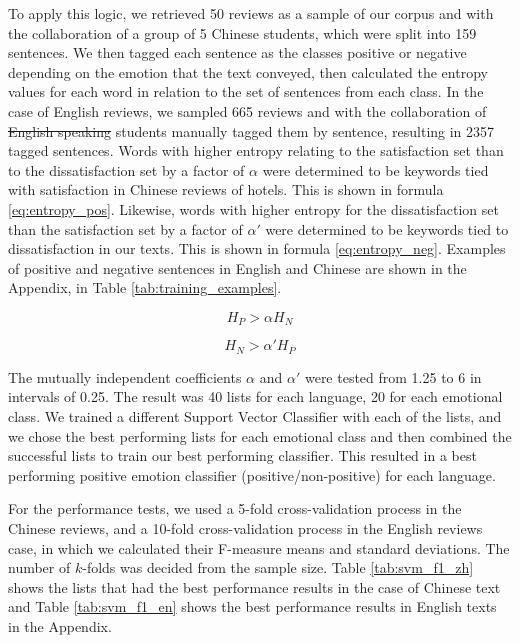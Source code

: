 \documentclass[review]{elsarticle}
\providecommand{\DIFadd}[1]{{\protect\color{blue}\uwave{#1}}} %
\providecommand{\DIFdel}[1]{{\protect\color{red}\sout{#1}}}                      %
\providecommand{\DIFaddbegin}{} %
\providecommand{\DIFaddend}{} %
\providecommand{\DIFdelbegin}{} %
\providecommand{\DIFdelend}{} %
\newcommand{\DIFscaledelfig}{0.5}
\newlength{\DIFdelgraphicswidth} %
\newlength{\DIFdelgraphicsheight} %
\newcommand{\DIFaddincludegraphics}[2][]{{\color{blue}\fbox{\DIFOincludegraphics[#1]{#2}}}} %
\newcommand{\DIFdelincludegraphics}[2][]{%
\sbox{\DIFdelgraphicsbox}{\DIFOincludegraphics[#1]{#2}}%
\settoboxwidth{\DIFdelgraphicswidth}{\DIFdelgraphicsbox} %
\settoboxtotalheight{\DIFdelgraphicsheight}{\DIFdelgraphicsbox} %
\scalebox{\DIFscaledelfig}{%
\parbox[b]{\DIFdelgraphicswidth}{\usebox{\DIFdelgraphicsbox}\\[-\baselineskip] \rule{\DIFdelgraphicswidth}{0em}}\llap{\resizebox{\DIFdelgraphicswidth}{\DIFdelgraphicsheight}{%
\setlength{\unitlength}{\DIFdelgraphicswidth}%
\begin{picture}(1,1)%
\thicklines\linethickness{2pt} %
{\color[rgb]{1,0,0}\put(0,0){\framebox(1,1){}}}%
{\color[rgb]{1,0,0}\put(0,0){\line( 1,1){1}}}%
{\color[rgb]{1,0,0}\put(0,1){\line(1,-1){1}}}%
\end{picture}%
}\hspace*{3pt}}} %
} %
\DeclareRobustCommand{\DIFaddbegin}{\DIFOaddbegin \let\includegraphics\DIFaddincludegraphics} %
\DeclareRobustCommand{\DIFaddend}{\DIFOaddend \let\includegraphics\DIFOincludegraphics} %
\DeclareRobustCommand{\DIFdelbegin}{\DIFOdelbegin \let\includegraphics\DIFdelincludegraphics} %
\DeclareRobustCommand{\DIFdelend}{\DIFOaddend \let\includegraphics\DIFOincludegraphics} %
\begin{document}
To apply this logic, we retrieved 50 reviews as a sample of our corpus and with the collaboration of a group of 5 Chinese students, which were split into 159 sentences. We then tagged each sentence as the classes positive or negative depending on the emotion that the text conveyed, then calculated the entropy values for each word in relation to the set of sentences from each class. In the case of English reviews, we sampled 665 reviews and with the collaboration of \DIFdelbegin \DIFdel{English speaking }\DIFdelend \DIFaddbegin \DIFadd{English-speaking }\DIFaddend students manually tagged them by sentence, resulting in \num[group-separator={,}]{2357} tagged sentences. Words with higher entropy relating to the satisfaction set than to the dissatisfaction set by a factor of \(\alpha\) were determined to be keywords tied with satisfaction in Chinese reviews of hotels. This is shown in formula \ref{eq:entropy_pos}. Likewise, words with higher entropy for the dissatisfaction set than the satisfaction set by a factor of \(\alpha'\) were determined to be keywords tied to dissatisfaction in our texts. This is shown in formula \ref{eq:entropy_neg}. Examples of positive and negative sentences in English and Chinese are shown in the Appendix, in Table \ref{tab:training_examples}.

\begin{equation}\label{eq:entropy_pos}
H_{P} > \alpha H_{N} %
\end{equation}

\begin{equation}\label{eq:entropy_neg}
H_{N} > \alpha' H_{P} %
\end{equation}

The mutually independent coefficients \(\alpha\) and \(\alpha'\) were tested from 1.25 to 6 in intervals of 0.25. The result was 40 lists for each language, 20 for each emotional class. We trained a different Support Vector Classifier with each of the lists, and we chose the best performing lists for each emotional class and then combined the successful lists to train our best performing classifier. This resulted in a best performing positive emotion classifier (positive/non-positive) for each language.

For the performance tests, we used a 5-fold cross-validation \cite[][]{kohavi1995} process in the Chinese reviews, and a 10-fold cross-validation process in the English reviews case, in which we calculated their F-measure \cite[][]{powers2011} means and standard deviations. The number of \(k\)-folds was decided from the sample size. Table \ref{tab:svm_f1_zh} shows the lists that had the best performance results in the case of Chinese text and Table \ref{tab:svm_f1_en} shows the best performance results in English texts in the Appendix. 
\end{document}
